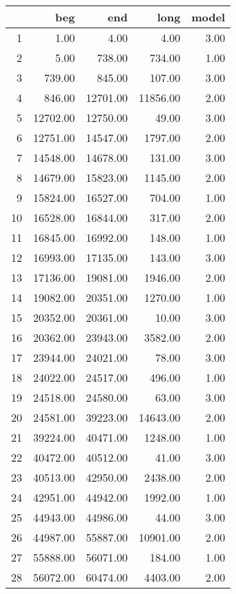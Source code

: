 \begingroup\tiny
\begin{tabular}{rrrrr}
  \hline
 & beg & end & long & model \\ 
  \hline
1 & 1.00 & 4.00 & 4.00 & 3.00 \\ 
  2 & 5.00 & 738.00 & 734.00 & 1.00 \\ 
  3 & 739.00 & 845.00 & 107.00 & 3.00 \\ 
  4 & 846.00 & 12701.00 & 11856.00 & 2.00 \\ 
  5 & 12702.00 & 12750.00 & 49.00 & 3.00 \\ 
  6 & 12751.00 & 14547.00 & 1797.00 & 2.00 \\ 
  7 & 14548.00 & 14678.00 & 131.00 & 3.00 \\ 
  8 & 14679.00 & 15823.00 & 1145.00 & 2.00 \\ 
  9 & 15824.00 & 16527.00 & 704.00 & 1.00 \\ 
  10 & 16528.00 & 16844.00 & 317.00 & 2.00 \\ 
  11 & 16845.00 & 16992.00 & 148.00 & 1.00 \\ 
  12 & 16993.00 & 17135.00 & 143.00 & 3.00 \\ 
  13 & 17136.00 & 19081.00 & 1946.00 & 2.00 \\ 
  14 & 19082.00 & 20351.00 & 1270.00 & 1.00 \\ 
  15 & 20352.00 & 20361.00 & 10.00 & 3.00 \\ 
  16 & 20362.00 & 23943.00 & 3582.00 & 2.00 \\ 
  17 & 23944.00 & 24021.00 & 78.00 & 3.00 \\ 
  18 & 24022.00 & 24517.00 & 496.00 & 1.00 \\ 
  19 & 24518.00 & 24580.00 & 63.00 & 3.00 \\ 
  20 & 24581.00 & 39223.00 & 14643.00 & 2.00 \\ 
  21 & 39224.00 & 40471.00 & 1248.00 & 1.00 \\ 
  22 & 40472.00 & 40512.00 & 41.00 & 3.00 \\ 
  23 & 40513.00 & 42950.00 & 2438.00 & 2.00 \\ 
  24 & 42951.00 & 44942.00 & 1992.00 & 1.00 \\ 
  25 & 44943.00 & 44986.00 & 44.00 & 3.00 \\ 
  26 & 44987.00 & 55887.00 & 10901.00 & 2.00 \\ 
  27 & 55888.00 & 56071.00 & 184.00 & 1.00 \\ 
  28 & 56072.00 & 60474.00 & 4403.00 & 2.00 \\ 

\end{tabular}
